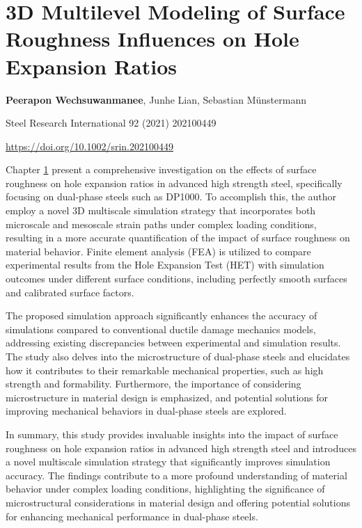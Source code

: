 \chapter[het]{3D Multilevel Modeling of Surface Roughness Influences on Hole Expansion Ratios}\label{ch:het}
\begin{center}

    \textbf{Peerapon Wechsuwanmanee}, Junhe Lian, Sebastian Münstermann
    
    \vspace{20pt}
    
    Steel Research International 92 (2021) 202100449
    
    \vspace{20pt}
    
    \url{https://doi.org/10.1002/srin.202100449}
    
    \vspace{40pt}
    
\end{center}

Chapter \ref{ch:het} present a comprehensive investigation on the effects of surface roughness on hole expansion ratios in advanced high strength steel, specifically focusing on dual-phase steels such as DP1000. To accomplish this, the author employ a novel 3D multiscale simulation strategy that incorporates both microscale and mesoscale strain paths under complex loading conditions, resulting in a more accurate quantification of the impact of surface roughness on material behavior. Finite element analysis (FEA) is utilized to compare experimental results from the Hole Expansion Test (HET) with simulation outcomes under different surface conditions, including perfectly smooth surfaces and calibrated surface factors.

The proposed simulation approach significantly enhances the accuracy of simulations compared to conventional ductile damage mechanics models, addressing existing discrepancies between experimental and simulation results. The study also delves into the microstructure of dual-phase steels and elucidates how it contributes to their remarkable mechanical properties, such as high strength and formability. Furthermore, the importance of considering microstructure in material design is emphasized, and potential solutions for improving mechanical behaviors in dual-phase steels are explored.

In summary, this study provides invaluable insights into the impact of surface roughness on hole expansion ratios in advanced high strength steel and introduces a novel multiscale simulation strategy that significantly improves simulation accuracy. The findings contribute to a more profound understanding of material behavior under complex loading conditions, highlighting the significance of microstructural considerations in material design and offering potential solutions for enhancing mechanical performance in dual-phase steels.